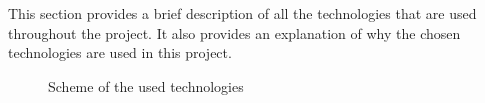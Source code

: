 This section provides a brief description of all the technologies that are used throughout the project. It also provides an explanation of why the chosen technologies are used in this project.

\begin{figure}[!h]
  \centering
  \caption{Scheme of the used technologies}
  \label{fig:technologies}
\end{figure}